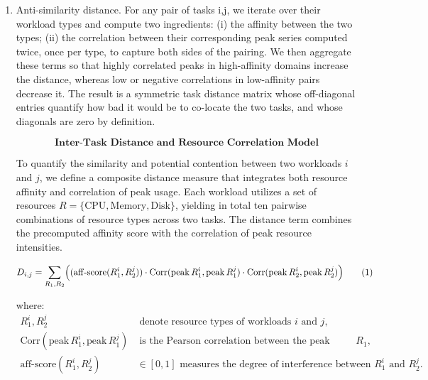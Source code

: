 \begin{enumerate}
    \item Anti-similarity distance. For any pair of tasks i,j, we iterate over their workload types and compute two ingredients: (i) the affinity between the two types; (ii) the correlation between their corresponding peak series computed twice, once per type, to capture both sides of the pairing. We then aggregate these terms so that highly correlated peaks in high-affinity domains increase the distance, whereas low or negative correlations in low-affinity pairs decrease it. The result is a symmetric task distance matrix whose off-diagonal entries quantify how bad it would be to co-locate the two tasks, and whose diagonals are zero by definition.

          \[
              \textbf{Inter-Task Distance and Resource Correlation Model}
          \]

          To quantify the similarity and potential contention between two workloads
          \( i \) and \( j \), we define a composite distance measure
          that integrates both resource affinity and correlation of peak usage.
          Each workload utilizes a set of resources
          \( R = \{ \text{CPU}, \text{Memory}, \text{Disk}\} \),
          yielding in total ten pairwise combinations of resource types across two tasks.
          The distance term combines the precomputed affinity score with the
          correlation of peak resource intensities.

          \[
              D_{i,j}
              = \sum_{R_1, R_2}
              \Bigl(
              (\mathrm{aff\text{-}score}(R_1^i, R_2^j))
              \cdot
              \mathrm{Corr}(\mathrm{peak}\,R_1^i, \mathrm{peak}\,R_1^j)
              \cdot
              \mathrm{Corr}(\mathrm{peak}\,R_2^i, \mathrm{peak}\,R_2^j)
              \Bigr)
              \tag{1}
          \]

          where:
          \begin{align}
              R_1^i, R_2^j & \; \text{denote resource types of workloads } i \text{ and } j,                           \\[4pt]
              \mathrm{Corr}(\mathrm{peak}\,R_1^i, \mathrm{peak}\,R_1^j)
                           & \; \text{is the Pearson correlation between the peak usages of resource } R_1,            \\[4pt]
              \mathrm{aff\text{-}score}(R_1^i, R_2^j)
                           & \in [0, 1] \text{ measures the degree of interference between } R_1^i \text{ and } R_2^j.
          \end{align}


\end{enumerate}
